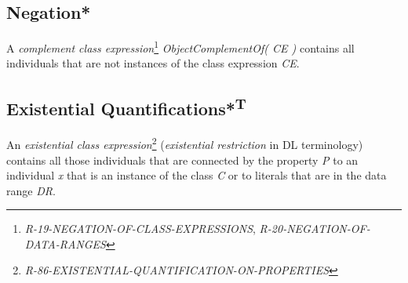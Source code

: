 \documentclass{llncs}
\begin{document}
\subsection{Negation*}

A \emph{complement class expression}\footnote{\emph{R-19-NEGATION-OF-CLASS-EXPRESSIONS}, \emph{R-20-NEGATION-OF-DATA-RANGES}} \emph{ObjectComplementOf( CE )} contains all individuals that are not instances of the class expression \emph{CE}. 

\subsection{Existential Quantifications*\textsuperscript{T}}

An \emph{existential class expression}\footnote{{\em R-86-EXISTENTIAL-QUANTIFICATION-ON-PROPERTIES}} ({\em existential restriction} in DL terminology) contains all those individuals that are connected by the property \emph{P} to an individual \emph{x} that is an instance of the class \emph{C} or to literals that are in the data range \emph{DR}.
\end{document}

